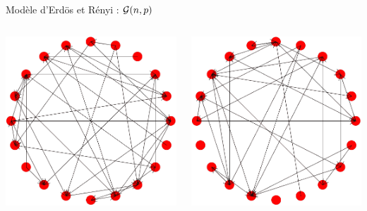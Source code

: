 \documentclass[french,bookmarks]{beamer}
\newcommand{\bcG}{\mathcal{G}}
\begin{document}
\begin{frame}{Modèle d'Erdös et Rényi : $\bcG\p{n, p}$}
    \begin{bexample}{}{}
        \begin{columns}
            \centering\includegraphics[scale=0.16]{MPI - Maths/Expose/images/exG1.png}
                    
            \centering\includegraphics[scale=0.16]{MPI - Maths/Expose/images/exG2.png}
            

\end{columns}
\end{bexample}
\end{frame}
\end{document}
